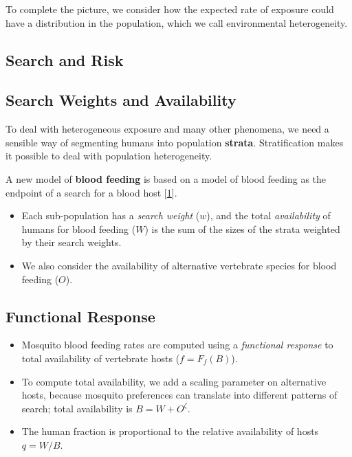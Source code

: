 \documentclass[
]{book}
\begin{document}
To complete the picture, we consider how the expected rate of exposure could have a distribution in the population, which we call environmental heterogeneity.

\hypertarget{search-and-risk}{%
\subsection{Search and Risk}\label{search-and-risk}}

\hypertarget{search-weights-and-availability}{%
\subsection{Search Weights and Availability}\label{search-weights-and-availability}}

To deal with heterogeneous exposure and many other phenomena, we need a sensible way of segmenting humans into population \textbf{strata}. Stratification makes it possible to deal with population heterogeneity.

A new model of \textbf{blood feeding} is based on a model of blood feeding as the endpoint of a search for a blood host {[}\protect\hyperlink{ref-WuSL2022SpatialDynamics}{1}{]}.

\begin{itemize}
\item
  Each sub-population has a \emph{search weight} (\(w\)), and the total \emph{availability} of humans for blood feeding (\(W\)) is the sum of the sizes of the strata weighted by their search weights.
\item
  We also consider the availability of alternative vertebrate species for blood feeding (\(O\)).
\end{itemize}

\hypertarget{functional-response}{%
\subsection{Functional Response}\label{functional-response}}

\begin{itemize}
\item
  Mosquito blood feeding rates are computed using a \emph{functional response} to total availability of vertebrate hosts (\(f = F_f(B)\)).
\item
  To compute total availability, we add a scaling parameter on alternative hosts, because mosquito preferences can translate into different patterns of search; total availability is \(B=W + O^\zeta\).
\item
  The human fraction is proportional to the relative availability of hosts \(q = W/B\).
\end{itemize}
\end{document}
